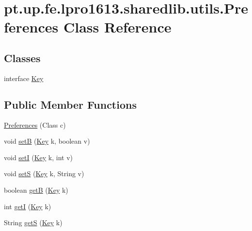 \hypertarget{classpt_1_1up_1_1fe_1_1lpro1613_1_1sharedlib_1_1utils_1_1_preferences}{}\section{pt.\+up.\+fe.\+lpro1613.\+sharedlib.\+utils.\+Preferences Class Reference}
\label{classpt_1_1up_1_1fe_1_1lpro1613_1_1sharedlib_1_1utils_1_1_preferences}
\subsection*{Classes}
\begin{DoxyCompactItemize}
\item 
interface \hyperlink{interfacept_1_1up_1_1fe_1_1lpro1613_1_1sharedlib_1_1utils_1_1_preferences_1_1_key}{Key}
\end{DoxyCompactItemize}
\subsection*{Public Member Functions}
\begin{DoxyCompactItemize}
\item 
\hyperlink{classpt_1_1up_1_1fe_1_1lpro1613_1_1sharedlib_1_1utils_1_1_preferences_a627a5dd379de9b1b034761c585e4a87a}{Preferences} (Class c)
\item 
void \hyperlink{classpt_1_1up_1_1fe_1_1lpro1613_1_1sharedlib_1_1utils_1_1_preferences_a746848d01972f8874044aef35a8621cb}{setB} (\hyperlink{interfacept_1_1up_1_1fe_1_1lpro1613_1_1sharedlib_1_1utils_1_1_preferences_1_1_key}{Key} k, boolean v)
\item 
void \hyperlink{classpt_1_1up_1_1fe_1_1lpro1613_1_1sharedlib_1_1utils_1_1_preferences_ad1e7c0fc12af226ce437da9ea8bd84f3}{setI} (\hyperlink{interfacept_1_1up_1_1fe_1_1lpro1613_1_1sharedlib_1_1utils_1_1_preferences_1_1_key}{Key} k, int v)
\item 
void \hyperlink{classpt_1_1up_1_1fe_1_1lpro1613_1_1sharedlib_1_1utils_1_1_preferences_a7ef4c07c94b75f3bb5cf27c4533f01b6}{setS} (\hyperlink{interfacept_1_1up_1_1fe_1_1lpro1613_1_1sharedlib_1_1utils_1_1_preferences_1_1_key}{Key} k, String v)
\item 
boolean \hyperlink{classpt_1_1up_1_1fe_1_1lpro1613_1_1sharedlib_1_1utils_1_1_preferences_ad42ac07907c3bb6066925a1de8706007}{getB} (\hyperlink{interfacept_1_1up_1_1fe_1_1lpro1613_1_1sharedlib_1_1utils_1_1_preferences_1_1_key}{Key} k)
\item 
int \hyperlink{classpt_1_1up_1_1fe_1_1lpro1613_1_1sharedlib_1_1utils_1_1_preferences_a6b5169368a838aca6c6880826294aea7}{getI} (\hyperlink{interfacept_1_1up_1_1fe_1_1lpro1613_1_1sharedlib_1_1utils_1_1_preferences_1_1_key}{Key} k)
\item 
String \hyperlink{classpt_1_1up_1_1fe_1_1lpro1613_1_1sharedlib_1_1utils_1_1_preferences_aada2e7f8fe94b6a7ef78cfb30637b982}{getS} (\hyperlink{interfacept_1_1up_1_1fe_1_1lpro1613_1_1sharedlib_1_1utils_1_1_preferences_1_1_key}{Key} k)
\end{DoxyCompactItemize}


